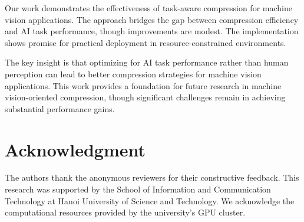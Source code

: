 \documentclass[conference]{IEEEtran}
\begin{document}
Our work demonstrates the effectiveness of task-aware compression for machine vision applications. The approach bridges the gap between compression efficiency and AI task performance, though improvements are modest. The implementation shows promise for practical deployment in resource-constrained environments.

The key insight is that optimizing for AI task performance rather than human perception can lead to better compression strategies for machine vision applications. This work provides a foundation for future research in machine vision-oriented compression, though significant challenges remain in achieving substantial performance gains.

\section*{Acknowledgment}

The authors thank the anonymous reviewers for their constructive feedback. This research was supported by the School of Information and Communication Technology at Hanoi University of Science and Technology. We acknowledge the computational resources provided by the university's GPU cluster.
\end{document}
